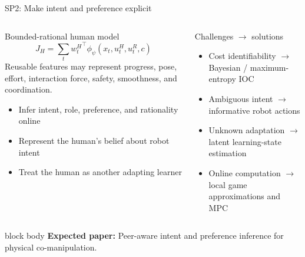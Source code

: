\documentclass[aspectratio=169,11pt]{beamer}
\newcommand{\paperout}[1]{%
  \begin{beamercolorbox}[rounded=true,sep=0.55em,wd=\linewidth]{block body}
    \footnotesize\textbf{Expected paper:} #1
  \end{beamercolorbox}}
\begin{document}
\begin{frame}[shrink=6]{SP2: Make intent and preference explicit}
\footnotesize
\begin{columns}[T,onlytextwidth]
\begin{block}{Bounded-rational human model}
\[
J_H=\sum_t {w_t^H}^{\!\top}\phi_\psi(x_t,u_t^H,u_t^R,c)
\]
Reusable features may represent progress, pose, effort, interaction force, safety, smoothness, and coordination.
\begin{itemize}
  \item Infer intent, role, preference, and rationality online
  \item Represent the human's belief about robot intent
  \item Treat the human as another adapting learner
\end{itemize}
\end{block}
\begin{alertblock}{Challenges $\rightarrow$ solutions}
\begin{itemize}
  \item Cost identifiability $\rightarrow$ Bayesian / maximum-entropy IOC
  \item Ambiguous intent $\rightarrow$ informative robot actions
  \item Unknown adaptation $\rightarrow$ latent learning-state estimation
  \item Online computation $\rightarrow$ local game approximations and MPC
\end{itemize}
\end{alertblock}
\end{columns}
\vspace{0.15cm}
\paperout{Peer-aware intent and preference inference for physical co-manipulation.}
\end{frame}
\end{document}

